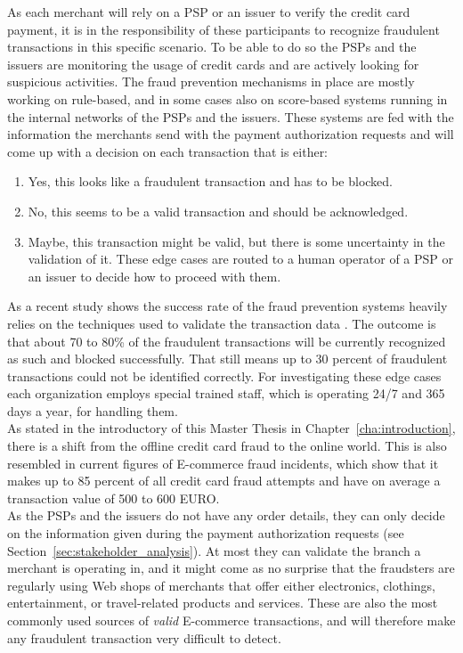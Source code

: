 As each merchant will rely on a \gls{PSP} or an issuer to verify the credit card payment, it is in the responsibility of these participants to recognize fraudulent transactions in this specific scenario. To be able to do so the \gls{PSP}s and the issuers are monitoring the usage of credit cards and are actively looking for suspicious activities. The fraud prevention mechanisms in place are mostly working on rule-based, and in some cases also on score-based systems running in the internal networks of the \gls{PSP}s and the issuers. These systems are fed with the information the merchants send with the payment authorization requests and will come up with a decision on each transaction that is either:\@

\begin{enumerate}
  \item Yes, this looks like a fraudulent transaction and has to be blocked.
  \item No, this seems to be a valid transaction and should be acknowledged.
  \item Maybe, this transaction might be valid, but there is some uncertainty in the validation of it. These edge cases are routed to a human operator of a \gls{PSP} or an issuer to decide how to proceed with them.
\end{enumerate}

As a recent study shows the success rate of the fraud prevention systems heavily relies on the techniques used to validate the transaction data \citep{rana2015survey}. The outcome is that about 70 to 80\% of the fraudulent transactions will be currently recognized as such and blocked successfully. That still means up to 30 percent of fraudulent transactions could not be identified correctly. For investigating these edge cases each organization employs special trained staff, which is operating 24/7 and 365 days a year, for handling them. \\

As stated in the introductory of this Master Thesis in Chapter~\ref{cha:introduction}, there is a shift from the offline credit card fraud to the online world. This is also resembled in current figures of \gls{E-commerce} fraud incidents, which show that it makes up to 85 percent of all credit card fraud attempts and have on average a transaction value of 500 to 600 EURO.\\

As the \gls{PSP}s and the issuers do not have any order details, they can only decide on the information given during the payment authorization requests (see Section~\ref{sec:stakeholder_analysis}). At most they can validate the branch a merchant is operating in, and it might come as no surprise that the fraudsters are regularly using Web shops of merchants that offer either electronics, clothings, entertainment, or travel-related products and services. These are also the most commonly used sources of \emph{valid} \gls{E-commerce} transactions, and will therefore make any fraudulent transaction very difficult to detect. \\


